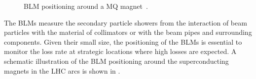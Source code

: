 \begin{figure}[htbp]
  \centering
  \caption{BLM positioning around a MQ magnet~\cite{lechner:blmpos}. }  
  \label{pic:16071902}
  \end{figure}




The BLMs measure the secondary particle showers from the interaction of beam particles with the material of collimators or with the beam pipes and surrounding components. Given their small size, the positioning of the BLMs is essential to monitor the loss rate at strategic locations where high losses are expected. A schematic illustration of the BLM positioning around the superconducting magnets in the LHC arcs is shown in . 


\newpage


